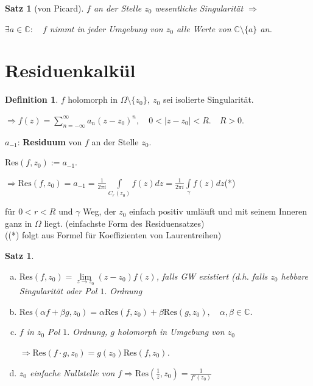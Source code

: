 \documentclass[ngerman,halfparskip]{scrartcl}
\newtheorem*{satz}{Satz}
\newtheorem*{satz*}{Satz}
\theoremstyle{definition}
\newtheorem*{defin}{Definition}
\def\C{\mathbb C}
\def\Res{\text{Res}}
\begin{document}
\begin{satz*}[von Picard]
$f$ an der Stelle $z_0$ wesentliche Singularität $\Rightarrow$

$\exists a\in\C: \quad f$ nimmt in jeder Umgebung von $z_0$ alle Werte von $\C\setminus\{a\}$ an.
\end{satz*}




\section{Residuenkalkül}
\begin{defin}
$f$ holomorph in $\Omega \setminus \{z_0\}, ~z_0$ sei isolierte Singularität. 

$\Rightarrow f(z)=\sum\limits_{n=-\infty}^\infty a_n(z-z_0)^n,\quad 0<|z-z_0|<R.\quad R>0$.

$a_{-1}$: \textbf{Residuum} von $f$ an der Stelle $z_0$.

$\Res (f,z_0):=a_{-1}$.
\end{defin}

$\Rightarrow \Res (f,z_0)=a_{-1}=\frac 1{2\pi i }\int\limits_{C_r(z_0)}f(z)dz=\frac 1{2\pi i }\int\limits_{\gamma}f(z)dz$\hfill (*)

für $0<r<R$ und $\gamma$ Weg, der $z_0$ einfach positiv umläuft und mit seinem Inneren ganz in $\Omega$ liegt. (einfachste Form des Residuensatzes)\\
((*) folgt aus Formel für Koeffizienten von Laurentreihen)

\begin{satz}~\\
\begin{enumerate}[a)]
\item $\Res (f,z_0)=\lim\limits_{z\rightarrow z_0 }(z-z_0) f(z)$, falls GW existiert (d.h. falls $z_0$ hebbare Singularität oder Pol $1.$ Ordnung
\item $\Res (\alpha f+\beta g,z_0)=\alpha \Res(f,z_0)+\beta \Res (g,z_0), \quad \alpha,\beta\in\C$.
\item $f$ in $z_0$ Pol $1.$ Ordnung, $g$ holomorph in Umgebung von $z_0$

$\Rightarrow \Res (f\cdot g, z_0)=g(z_0)\Res (f,z_0)$.
\item $z_0$ einfache Nullstelle von $f \Rightarrow \Res (\frac 1z, z_0) =\frac 1 {f'(z_0)}$
\end{enumerate}
\end{satz}
\end{document}
